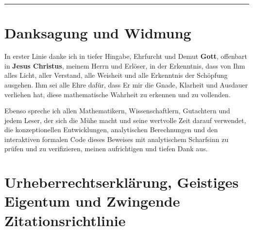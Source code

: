 \documentclass[11pt,a4paper]{article}
\theoremstyle{definition}
\theoremstyle{remark}
\begin{document}
\tableofcontents

\vspace{1.5em}
\hrule
\vspace{1.5em}

\section*{Danksagung und Widmung}

In erster Linie danke ich in tiefer Hingabe, Ehrfurcht und Demut \textbf{Gott}, offenbart in \textbf{Jesus Christus}, meinem Herrn und Erlöser, in der Erkenntnis, dass von Ihm alles Licht, aller Verstand, alle Weisheit und alle Erkenntnis der Schöpfung ausgehen. Ihm sei alle Ehre dafür, dass Er mir die Gnade, Klarheit und Ausdauer verliehen hat, diese mathematische Wahrheit zu erkennen und zu vollenden.

Ebenso spreche ich allen Mathematikern, Wissenschaftlern, Gutachtern und jedem Leser, der sich die Mühe macht und seine wertvolle Zeit darauf verwendet, die konzeptionellen Entwicklungen, analytischen Berechnungen und den interaktiven formalen Code dieses Beweises mit analytischem Scharfsinn zu prüfen und zu verifizieren, meinen aufrichtigen und tiefen Dank aus.

\vspace{1.5em}

\section*{Urheberrechtserklärung, Geistiges Eigentum und Zwingende Zitationsrichtlinie}
\end{document}
